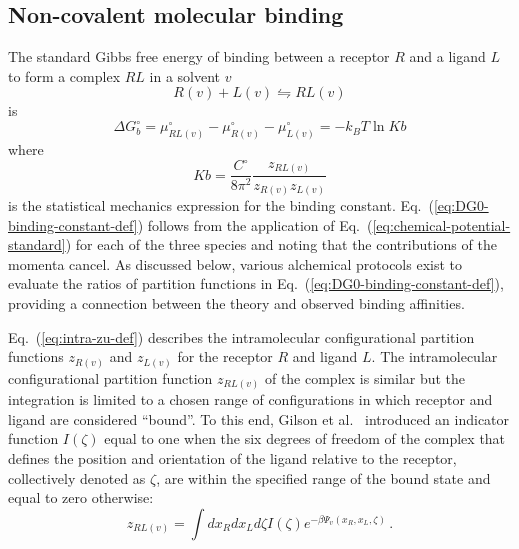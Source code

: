 \documentclass[9pt,bestpractices,pubversion]{livecoms}
\begin{document}
\subsection{Non-covalent molecular binding}

The standard Gibbs free energy of binding between a receptor $R$ and a ligand $L$ to form a complex $RL$ in a solvent $v$
\begin{equation}
  R(v) + L(v)  \leftrightharpoons RL(v)
  \label{eq:binding-reaction}
\end{equation}
is
\begin{equation}
  \Delta G^\circ_{b} = \mu^\circ_{RL(v)}  - \mu^\circ_{R(v)} - \mu^\circ_{L(v)} = -k_B T \ln Kb 
  \label{eq:DG0-binding-def}
\end{equation}
where~\cite{gilson1997statisticalthermodynamic,gilson2007calculation}
\begin{equation}
  Kb = \frac{C^\circ}{8 \pi^2} \frac{z_{RL(v)}}{z_{R(v)} z_{L(v)}}
  \label{eq:DG0-binding-constant-def}
\end{equation}
is the statistical mechanics expression for the binding constant. Eq.~(\ref{eq:DG0-binding-constant-def}) follows from the application of  Eq.~(\ref{eq:chemical-potential-standard}) for each of the three species and noting that the contributions of the momenta cancel. As discussed below, various alchemical protocols exist to evaluate the ratios of partition functions in Eq.~(\ref{eq:DG0-binding-constant-def}), providing a connection between the theory and observed binding affinities.

Eq.~(\ref{eq:intra-zu-def}) describes the intramolecular configurational partition functions $z_{R(v)}$ and $z_{L(v)}$ for the receptor $R$ and ligand $L$. The intramolecular configurational partition function $z_{RL(v)}$ of the complex is similar but the integration is limited to a chosen range of configurations in which receptor and ligand are considered ``bound''. To this end, Gilson et al.~\cite{gilson1997statisticalthermodynamic} introduced an indicator function $I(\zeta)$ equal to one when the six degrees of freedom of the complex that defines the position and orientation of the ligand relative to the receptor, collectively denoted as $\zeta$, are within the specified range of the bound state and equal to zero otherwise:
\begin{equation}
  z_{RL(v)} = \int dx_R dx_L d\zeta I(\zeta) e^{-\beta \Psi_v(x_R, x_L, \zeta)} \, .
  \label{eq:intra-zRL-def}
\end{equation}
\end{document}
